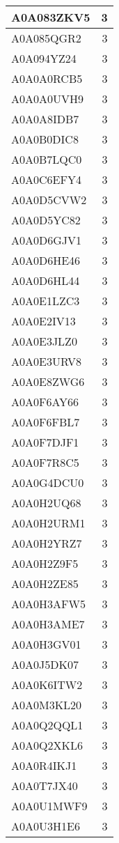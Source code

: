 \documentclass[
]{book}
\theoremstyle{definition}
\theoremstyle{definition}
\theoremstyle{definition}
\theoremstyle{definition}
\theoremstyle{remark}
\begin{document}
\begin{table}
\begin{tabular}{l|r}
\hline
A0A083ZKV5 & 3\\
\hline
A0A085QGR2 & 3\\
\hline
A0A094YZ24 & 3\\
\hline
A0A0A0RCB5 & 3\\
\hline
A0A0A0UVH9 & 3\\
\hline
A0A0A8IDB7 & 3\\
\hline
A0A0B0DIC8 & 3\\
\hline
A0A0B7LQC0 & 3\\
\hline
A0A0C6EFY4 & 3\\
\hline
A0A0D5CVW2 & 3\\
\hline
A0A0D5YC82 & 3\\
\hline
A0A0D6GJV1 & 3\\
\hline
A0A0D6HE46 & 3\\
\hline
A0A0D6HL44 & 3\\
\hline
A0A0E1LZC3 & 3\\
\hline
A0A0E2IV13 & 3\\
\hline
A0A0E3JLZ0 & 3\\
\hline
A0A0E3URV8 & 3\\
\hline
A0A0E8ZWG6 & 3\\
\hline
A0A0F6AY66 & 3\\
\hline
A0A0F6FBL7 & 3\\
\hline
A0A0F7DJF1 & 3\\
\hline
A0A0F7R8C5 & 3\\
\hline
A0A0G4DCU0 & 3\\
\hline
A0A0H2UQ68 & 3\\
\hline
A0A0H2URM1 & 3\\
\hline
A0A0H2YRZ7 & 3\\
\hline
A0A0H2Z9F5 & 3\\
\hline
A0A0H2ZE85 & 3\\
\hline
A0A0H3AFW5 & 3\\
\hline
A0A0H3AME7 & 3\\
\hline
A0A0H3GV01 & 3\\
\hline
A0A0J5DK07 & 3\\
\hline
A0A0K6ITW2 & 3\\
\hline
A0A0M3KL20 & 3\\
\hline
A0A0Q2QQL1 & 3\\
\hline
A0A0Q2XKL6 & 3\\
\hline
A0A0R4IKJ1 & 3\\
\hline
A0A0T7JX40 & 3\\
\hline
A0A0U1MWF9 & 3\\
\hline
A0A0U3H1E6 & 3\\

\end{tabular}
\end{table}
\end{document}
